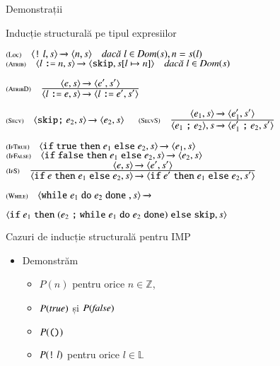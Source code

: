 \documentclass[xcolor=pdftex,romanian,colorlinks,handout]{beamer}
\begin{document}
\begin{section}{Demonstrații}
\begin{subsection}{Inducție structurală pe tipul expresiilor}
\begin{frame}
\vfill $\reg[Loc]{\Ss{\c{\terminal{!} l,\stare}}{\c{n, \stare}}}{}{l\in\Dom(\stare), n = \stare(l)}$
$\reg[Atrib]{\Ss{\c{l \terminal{:=} n,\stare}}{\c{\terminal{skip},\stare[l \mapsto n]}}}{}{l\in\Dom(\stare)}$

\vfill$\reg[AtribD]{\Ss{\c{l \terminal{:=} e ,\stare}}{\c{l \terminal{:=} e' ,\stare'}}}{\Ss{\c{e,\stare}}{\c{e',\stare'}}}{}$

$\reg[Secv]{\Ss{\c{\terminal{skip} \terminal{;} e_2,\stare}}{\c{e_2,\stare}}}{}{}$
$\reg[SecvS]{\Ss{\c{e_1 \terminal{;} e_2},\stare}{\c{e_1' \terminal{;} e_2,\stare'}}}{\Ss{\c{e_1,\stare}}{\c{e_1',\stare'}}}{}$


\vfill $\reg[IfTrue]{\Ss{\c{\Sif  {\terminal{true}} \Sthen e_1 \Selse e_2,\stare}}{\c{e_1,\stare}}}{}{}$ 
$\reg[IfFalse]{\Ss{\c{\Sif {\terminal{false}} \Sthen e_1 \Selse e_2,\stare}}{\c{e_2,\stare}}}{}{}$ 
$\reg[IfS]{
 \Ss{\c{\Sif {e} \Sthen e_1 \Selse e_2,\stare}}{\c{\Sif  {e'} \Sthen e_1 \Selse e_2,\stare'}}
}{
  \Ss{\c{e,\stare}}{\c{e',\stare'}}
}
{}$

\vfill $\reg[While]{\Ss{\c{\Swhile {e_1} \Sdo e_2 \Sdone{},\stare}}{}}{}
{}$

\hfill ${\langle{\ensuremath\mathrel{\text{\ttfamily if}}{e_1} \ensuremath\mathrel{\text{\ttfamily then}}(e_2\ensuremath\mathrel{\text{\ttfamily ;}} {\ensuremath\mathrel{\text{\ttfamily while}}{e_1} \ensuremath\mathrel{\text{\ttfamily do}}e_2 \ensuremath\mathrel{\text{\ttfamily done}}}) \ensuremath\mathrel{\text{\ttfamily else}}{\ensuremath\mathrel{\text{\ttfamily skip}}},s}\rangle}$

\end{frame}


\begin{frame}{Cazuri de inducție structurală pentru IMP}{}
\begin{itemize}
\item[]  
Demonstrăm
\begin{itemize}
\item $P(n)$ pentru orice $n \in \mathbb{Z}$,
\item $P({\it true})$ și $P({\it false})$
\item $P(\mathrel{\text{\ttfamily ()}})$
\item$P(\mathrel{\text{\ttfamily !}} l)$ pentru orice $l\in \mathbb{L}$
\end{itemize}


\end{itemize}
\end{frame}
\end{subsection}
\end{section}
\end{document}
